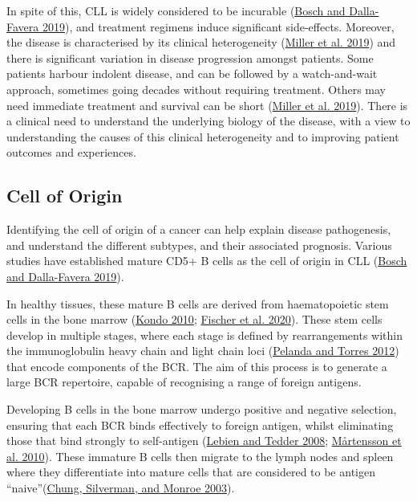 \documentclass[11pt, a4paper, twosided]{book}
\begin{document}
In spite of this, CLL is widely considered to be incurable (\protect\hyperlink{ref-Bosch2019}{Bosch and Dalla-Favera 2019}), and treatment regimens induce significant side-effects. Moreover, the disease is characterised by its clinical heterogeneity (\protect\hyperlink{ref-Miller2019}{Miller et al. 2019}) and there is significant variation in disease progression amongst patients. Some patients harbour indolent disease, and can be followed by a watch-and-wait approach, sometimes going decades without requiring treatment. Others may need immediate treatment and survival can be short (\protect\hyperlink{ref-Miller2019}{Miller et al. 2019}). There is a clinical need to understand the underlying biology of the disease, with a view to understanding the causes of this clinical heterogeneity and to improving patient outcomes and experiences.

\hypertarget{intro-cell-of-origin}{%
\subsection{Cell of Origin}\label{intro-cell-of-origin}}

Identifying the cell of origin of a cancer can help explain disease pathogenesis, and understand the different subtypes, and their associated prognosis. Various studies have established mature CD5+ B cells as the cell of origin in CLL (\protect\hyperlink{ref-Bosch2019}{Bosch and Dalla-Favera 2019}).

In healthy tissues, these mature B cells are derived from haematopoietic stem cells in the bone marrow (\protect\hyperlink{ref-Kondo2010}{Kondo 2010}; \protect\hyperlink{ref-Fischer2020}{Fischer et al. 2020}). These stem cells develop in multiple stages, where each stage is defined by rearrangements within the immunoglobulin heavy chain and light chain loci (\protect\hyperlink{ref-Pelanda2012}{Pelanda and Torres 2012}) that encode components of the BCR. The aim of this process is to generate a large BCR repertoire, capable of recognising a range of foreign antigens.

Developing B cells in the bone marrow undergo positive and negative selection, ensuring that each BCR binds effectively to foreign antigen, whilst eliminating those that bind strongly to self-antigen (\protect\hyperlink{ref-Lebien2008}{Lebien and Tedder 2008}; \protect\hyperlink{ref-Martensson2010}{Mårtensson et al. 2010}). These immature B cells then migrate to the lymph nodes and spleen where they differentiate into mature cells that are considered to be antigen ``naive''(\protect\hyperlink{ref-Chung2003}{Chung, Silverman, and Monroe 2003}).
\end{document}
